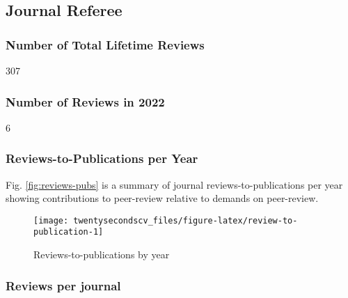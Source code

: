 \documentclass[10pt,a4paper,]{twentysecondcv}
\begin{document}
\hypertarget{journal-referee}{%
\subsection{Journal Referee}\label{journal-referee}}

\hypertarget{number-of-total-lifetime-reviews}{%
\subsubsection{Number of Total Lifetime
Reviews}\label{number-of-total-lifetime-reviews}}

307

\hypertarget{number-of-reviews-in-2022}{%
\subsubsection{Number of Reviews in
2022}\label{number-of-reviews-in-2022}}

6

\hypertarget{reviews-to-publications-per-year}{%
\subsubsection{Reviews-to-Publications per
Year}\label{reviews-to-publications-per-year}}

Fig. \ref{fig:reviews-pubs} is a summary of journal
reviews-to-publications per year showing contributions to peer-review
relative to demands on peer-review.

\begin{figure}

{\centering \texttt{[image: twentysecondscv\_files/figure-latex/review-to-publication-1]} 

}

\caption{\label{fig:reviews-pubs}Reviews-to-publications by year}\label{fig:review-to-publication}
\end{figure}

\hypertarget{reviews-per-journal}{%
\subsubsection{Reviews per journal}\label{reviews-per-journal}}

\nopagebreak
\end{document}
